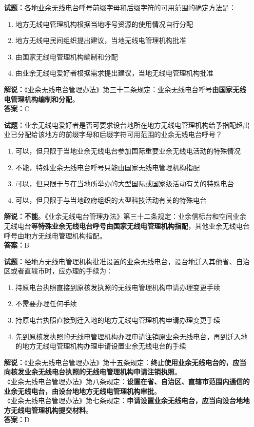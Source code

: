 \documentclass{ctexbook}
\begin{document}
\bigskip


\noindent\textbf{试题：}各地业余无线电台呼号前缀字母和后缀字符的可用范围的确定方法是：
\begin{enumerate}[leftmargin=3em]
\item 地方无线电管理机构根据当地呼号资源的使用情况自行分配
\item 地方无线电民间组织提出建议，当地无线电管理机构批准
\item 由国家无线电管理机构编制和分配
\item 由业余无线电爱好者根据需求提出建议，当地无线电管理机构批准
\end{enumerate}
\noindent\textbf{解说：}《业余无线电台管理办法》第三十二条规定：业余无线电台呼号\textbf{由国家无线电管理机构编制和分配}。\\\noindent\textbf{答案：}C



\bigskip


\noindent\textbf{试题：}业余无线电爱好者是否可要求设台地所在地方无线电管理机构给予指配超出业已分配给该地方的前缀字母和后缀字符可用范围的业余无线电台呼号？
\begin{enumerate}[leftmargin=3em]
\item 可以，但只限于当地业余无线电台参加国际重要业余无线电活动的特殊情况
\item 不能，特殊业余无线电台呼号只能由国家无线电管理机构指配
\item 可以，但只限于与在当地所举办的大型国际或国家级活动有关的特殊电台
\item 可以，但只限于与当地政府组织的大型科技活动有关的特殊电台
\end{enumerate}
\textbf{解说：不能}。《业余无线电台管理办法》第三十二条规定：业余信标台和空间业余无线电台等\textbf{特殊业余无线电台呼号由国家无线电管理机构指配}，其他业余无线电台呼号由地方无线电管理机构指配。\\\noindent\textbf{答案：}B



\bigskip


\noindent\textbf{试题：}经地方无线电管理机构批准设置的业余无线电台，设台地迁入其他省、自治区或者直辖市时，应办理的手续为：
\begin{enumerate}[leftmargin=3em]
\item 持原电台执照直接到原核发执照的无线电管理机构申请办理变更手续
\item 不需要办理任何手续
\item 持原电台执照直接到迁入地的地方无线电管理机构申请办理变更手续
\item 先到原核发执照的无线电管理机构办理申请注销原业余无线电台，再到迁入地的地方无线电管理机构办理申请设置业余无线电台的手续
\end{enumerate}
\noindent\textbf{解说：}《业余无线电台管理办法》第十五条规定：\textbf{终止使用业余无线电台的，应当向核发业余无线电台执照的无线电管理机构申请注销执照}。\\
《业余无线电台管理办法》第八条规定：\textbf{设置在省、自治区、直辖市范围内通信的业余无线电台，由设台地地方无线电管理机构审批}。\\
《业余无线电台管理办法》第七条规定：\textbf{申请设置业余无线电台，应当向设台地地方无线电管理机构提交材料}。\\\noindent\textbf{答案：}D
\end{document}
